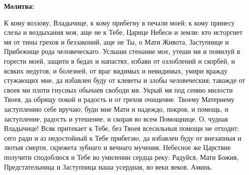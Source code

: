 \medskip


\bfseries Молитва:\normalfont{}\nopagebreak


К кому воззову, Владычице, к кому прибегну в печали моей; к кому принесу слезы и воздыхания моя, аще не к Тебе, Царице Небеси и земли: кто исторгнет мя от тины грехов и беззаконий, аще не Ты, о Мати Живота, Заступнице и Прибежище рода человеческаго. Услыши стенание мое, утеши мя и помилуй в горести моей, защити в бедах и напастях, избави от озлоблений и скорбей, и всяких недугов, и болезней, от враг видимых и невидимых, умири вражду стужающих мне, да избавлен буду от клеветы и злобы человеческия; такожде от своея ми плоти гнусных обычаев свободи мя. Укрый мя под сению милости Твоея, да обрящу покой и радость и от грехов очищение. Твоему Матернему заступлению себе вручаю; буди мне Мати и надеждо, покров, и помощь, и заступление, радость и утешение, и скорая во всем Помощнице. О, чудная Владычице! Всяк притекает к Тебе, без Твоея всесильныя помощи не отходит; сего ради и аз недостойный к Тебе прибегаю, да избавлен буду от внезапныя и лютыя смерти, скрежета зубнаго и вечнаго мучения. Небесное же Царствие получити сподоблюся и Тебе во умилении сердца реку: Радуйся, Мати Божия, Предстательница и Заступница наша усердная, во веки веков. Аминь.


\medskip\mychapterending

 


